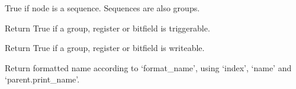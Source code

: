 \documentclass[letterpaper,10pt,english]{sphinxmanual}
\begin{document}
\begin{fulllineitems}
\begin{fulllineitems}
\label{\detokenize{developer:wuppercodegen.classes.Node.is_sequence}}
True if node is a sequence. Sequences are also groups.

\end{fulllineitems}


\begin{fulllineitems}
\label{\detokenize{developer:wuppercodegen.classes.Node.is_trigger}}
Return True if a group, register or bitfield is triggerable.

\end{fulllineitems}


\begin{fulllineitems}
\label{\detokenize{developer:wuppercodegen.classes.Node.is_write}}
Return True if a group, register or bitfield is writeable.

\end{fulllineitems}


\begin{fulllineitems}
\label{\detokenize{developer:wuppercodegen.classes.Node.print_name}}
Return formatted name according to `format\_name', using `index', `name' and `parent.print\_name'.

\end{fulllineitems}


\end{fulllineitems}

\end{document}
